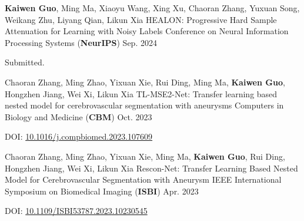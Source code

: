\begin{cventries}
  \cventry
  {\textbf{Kaiwen Guo}, Ming Ma, Xiaoyu Wang, Xing Xu, Chaoran Zhang, Yuxuan Song, Weikang Zhu, Liyang Qian, Likun Xia} %
  {HEALON: Progressive Hard Sample Attenuation for Learning with Noisy Labels} %
  {Conference on Neural Information Processing Systems (\textbf{NeurIPS})} %
  {Sep. 2024} %
  {
    \begin{cvitems}
      \item{Submitted.}
    \end{cvitems}
  }
  \papersaddspace
  \cventry
  {Chaoran Zhang, Ming Zhao, Yixuan Xie, Rui Ding, Ming Ma, \textbf{Kaiwen Guo}, Hongzhen Jiang, Wei Xi, Likun Xia} %
  {TL-MSE2-Net: Transfer learning based nested model for cerebrovascular segmentation with aneurysms} %
  {Computers in Biology and Medicine (\textbf{CBM})} %
  {Oct. 2023} %
  {
    \begin{cvitems}
      \item{DOI: \href{https://doi.org/10.1016/j.compbiomed.2023.107609}{10.1016/j.compbiomed.2023.107609}}
    \end{cvitems}
  }
  \papersaddspace
  \cventry
  {Chaoran Zhang, Ming Zhao, Yixuan Xie, Ming Ma, \textbf{Kaiwen Guo}, Rui Ding, Hongzhen Jiang, Wei Xi, Likun Xia} %
  {Rescon-Net: Transfer Learning Based Nested Model for Cerebrovascular Segmentation with Aneurysm} %
  {IEEE International Symposium on Biomedical Imaging (\textbf{ISBI})} %
  {Apr. 2023} %
  {
    \begin{cvitems}
      \item{DOI: \href{https://doi.org/10.1109/ISBI53787.2023.10230545}{10.1109/ISBI53787.2023.10230545}}
    \end{cvitems}
  }



\end{cventries}



